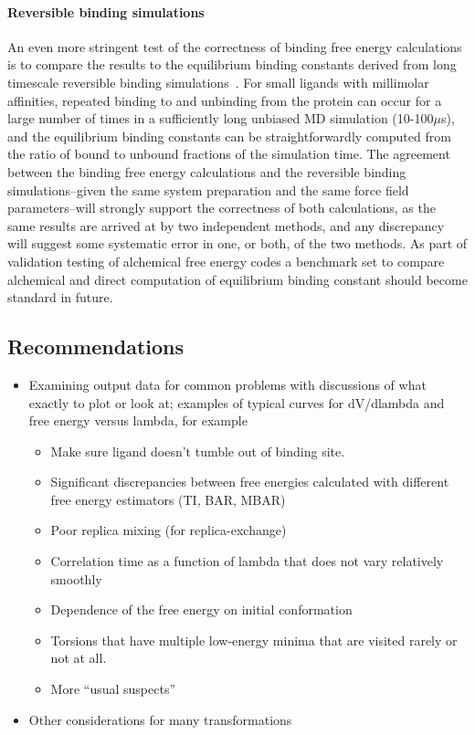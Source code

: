 \documentclass[9pt,bestpractices]{livecoms}
\begin{document}
%
\paragraph{Reversible binding simulations}
An even more stringent test of the correctness of binding free energy calculations is to compare the results to the equilibrium binding constants derived from long timescale reversible binding simulations~\cite{pan2017quantitative}.  For small ligands with millimolar affinities, repeated binding to and unbinding from the protein can occur for a large number of times in a sufficiently long unbiased MD simulation (10-100$\mu$s), and the equilibrium binding constants can be straightforwardly computed from the ratio of bound to unbound fractions of the simulation time. The agreement between the binding free energy calculations and the reversible binding simulations--given the same system preparation and the same force field parameters--will strongly support the correctness of both calculations, as the same results are arrived at by two independent methods, and any discrepancy will suggest some systematic error in one, or both, of the two methods. As part of validation testing of alchemical free energy codes a benchmark set to compare alchemical and direct computation of equilibrium binding constant should become standard in future.
%
\subsection{Recommendations}
\begin{itemize}
\item Examining output data for common problems with discussions of what exactly to plot or look at; examples of typical curves for dV/dlambda and free energy versus lambda, for example
\begin{itemize}
\item Make sure ligand doesn’t tumble out of binding site. 
\item Significant discrepancies between free energies calculated with different free energy estimators (TI, BAR, MBAR)
\item Poor replica mixing (for replica-exchange)
\item Correlation time as a function of lambda that does not vary relatively smoothly
\item Dependence of the free energy on initial conformation
\item Torsions that have multiple low-energy minima that are visited rarely or not at all. 
\item More “usual suspects”
\end{itemize}
\item Other considerations for many transformations
\end{itemize}
%
\end{document}
